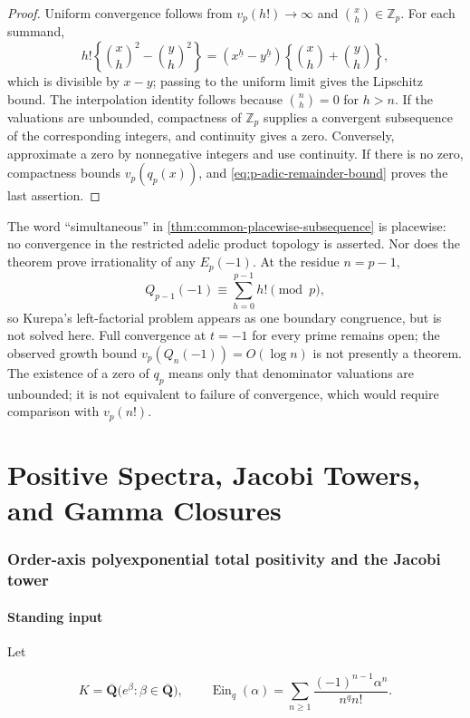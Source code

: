 \documentclass[11pt]{article}
\theoremstyle{keio}
\theoremstyle{definition}
\theoremstyle{remark}
\newcommand{\Z}{\mathbb Z}
\newcommand{\Ein}{\operatorname{Ein}}
\begin{document}
\begin{proof}
Uniform convergence follows from \(v_p(h!)\to\infty\) and
\(\binom xh\in\Z_p\).  For each summand,
\[
 h!\left\{\binom xh^2-\binom yh^2\right\}
 =\left(x^{\underline h}-y^{\underline h}\right)
  \left\{\binom xh+\binom yh\right\},
\]
which is divisible by \(x-y\); passing to the uniform limit gives the
Lipschitz bound.  The interpolation identity follows because
\(\binom nh=0\) for \(h>n\).  If the valuations are unbounded, compactness
of \(\Z_p\) supplies a convergent subsequence of the corresponding integers,
and continuity gives a zero.  Conversely, approximate a zero by
nonnegative integers and use continuity.  If there is no zero, compactness
bounds \(v_p(q_p(x))\), and \eqref{eq:p-adic-remainder-bound} proves the
last assertion.
\end{proof}

The word ``simultaneous'' in \cref{thm:common-placewise-subsequence} is
placewise: no convergence in the restricted adelic product topology is
asserted.  Nor does the theorem prove irrationality of any \(E_p(-1)\).
At the residue \(n=p-1\),
\begin{equation}\label{eq:Kurepa-contact}
 Q_{p-1}(-1)\equiv\sum_{h=0}^{p-1}h!\pmod p,
\end{equation}
so Kurepa's left-factorial problem appears as one boundary congruence, but is
not solved here.  Full convergence at \(t=-1\) for every prime remains open;
the observed growth bound \(v_p(Q_n(-1))=O(\log n)\) is not presently a
theorem.  The existence of a zero of \(q_p\) means only that denominator
valuations are unbounded; it is not equivalent to failure of convergence,
which would require comparison with \(v_p(n!)\).

\part{Positive Spectra, Jacobi Towers, and Gamma Closures}
\section{Order-axis polyexponential total positivity and the Jacobi tower}

\subsection{Standing input}

Let

\[
K=\overline{\mathbf Q}\bigl(e^\beta:\beta\in\overline{\mathbf Q}\bigr),\qquad
\Ein_q(\alpha)=\sum_{n\ge1}\frac{(-1)^{n-1}\alpha^n}{n^q n!}.
\]
\end{document}
